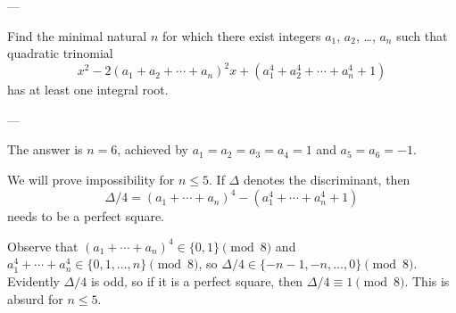
---

Find the minimal natural $n$ for which there exist integers $a_1$, $a_2$, \ldots, $a_n$ such that quadratic trinomial
\[x^2-2(a_1+a_2+\cdots+a_n)^2x+(a_1^4+a_2^4+\cdots+a_n^4+1)\]
has at least one integral root.

---

The answer is $n=6$, achieved by $a_1=a_2=a_3=a_4=1$ and $a_5=a_6=-1$.

We will prove impossibility for $n\le5$. If $\Delta$ denotes the discriminant, then
\[\Delta/4=(a_1+\cdots+a_n)^4-\left(a_1^4+\cdots+a_n^4+1\right)\]
needs to be a perfect square.

Observe that $(a_1+\cdots+a_n)^4\in\{0,1\}\pmod8$ and $a_1^4+\cdots+a_n^4\in\{0,1,\ldots,n\}\pmod8$, so $\Delta/4\in\{-n-1,-n,\ldots,0\}\pmod8$. Evidently $\Delta/4$ is odd, so if it is a perfect square, then $\Delta/4\equiv1\pmod8$. This is absurd for $n\le5$.

